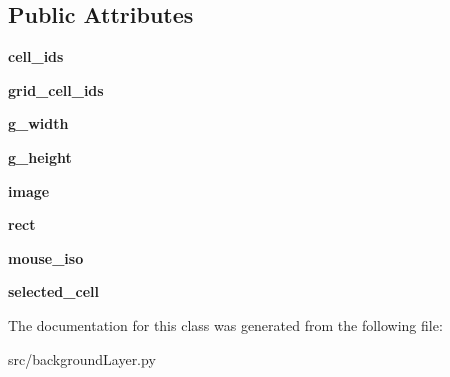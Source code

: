 \subsection*{Public Attributes}
\begin{DoxyCompactItemize}
\item 
\hypertarget{classsrc_1_1background_layer_1_1_background_layer_a3838274a8ae549ce626aef3f11734e5f}{}\label{classsrc_1_1background_layer_1_1_background_layer_a3838274a8ae549ce626aef3f11734e5f} 
{\bfseries cell\+\_\+ids}
\item 
\hypertarget{classsrc_1_1background_layer_1_1_background_layer_a6d401384cdd8fa8f0c1f214d44c575b7}{}\label{classsrc_1_1background_layer_1_1_background_layer_a6d401384cdd8fa8f0c1f214d44c575b7} 
{\bfseries grid\+\_\+cell\+\_\+ids}
\item 
\hypertarget{classsrc_1_1background_layer_1_1_background_layer_a7326ed5179e7e0fe7a9354137baf9b91}{}\label{classsrc_1_1background_layer_1_1_background_layer_a7326ed5179e7e0fe7a9354137baf9b91} 
{\bfseries g\+\_\+width}
\item 
\hypertarget{classsrc_1_1background_layer_1_1_background_layer_a055add5274636fda761f3f48a2774a24}{}\label{classsrc_1_1background_layer_1_1_background_layer_a055add5274636fda761f3f48a2774a24} 
{\bfseries g\+\_\+height}
\item 
\hypertarget{classsrc_1_1background_layer_1_1_background_layer_ab2f7d9440b47b6d14f59c0f3c68dec59}{}\label{classsrc_1_1background_layer_1_1_background_layer_ab2f7d9440b47b6d14f59c0f3c68dec59} 
{\bfseries image}
\item 
\hypertarget{classsrc_1_1background_layer_1_1_background_layer_a32a003bf39ad1c13a5e475c2eda81155}{}\label{classsrc_1_1background_layer_1_1_background_layer_a32a003bf39ad1c13a5e475c2eda81155} 
{\bfseries rect}
\item 
\hypertarget{classsrc_1_1background_layer_1_1_background_layer_af584c496e1bbe8b1c81da369b2919793}{}\label{classsrc_1_1background_layer_1_1_background_layer_af584c496e1bbe8b1c81da369b2919793} 
{\bfseries mouse\+\_\+iso}
\item 
\hypertarget{classsrc_1_1background_layer_1_1_background_layer_a016fb5e445a649543130c433b453e77f}{}\label{classsrc_1_1background_layer_1_1_background_layer_a016fb5e445a649543130c433b453e77f} 
{\bfseries selected\+\_\+cell}
\end{DoxyCompactItemize}


The documentation for this class was generated from the following file\+:\begin{DoxyCompactItemize}
\item 
src/background\+Layer.\+py\end{DoxyCompactItemize}
